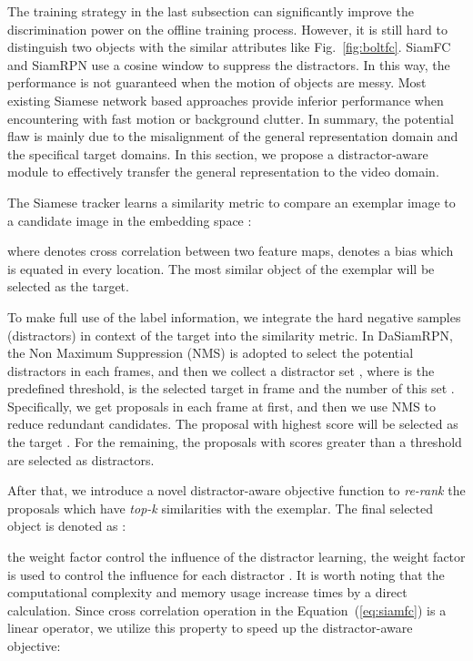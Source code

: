 \documentclass[runningheads]{llncs}
\begin{document}
The training strategy in the last subsection can significantly improve the discrimination power on the offline training process.
However, it is still hard to distinguish two objects with the similar attributes like Fig.~\ref{fig:boltfc}. SiamFC and SiamRPN use a cosine window to suppress the distractors. In this way, the performance is not guaranteed when the motion of objects are messy. Most existing Siamese network based approaches provide inferior performance when encountering with fast motion or background clutter. In summary, the potential flaw is mainly due to the misalignment of the general representation domain and the specifical target domains. In this section, we propose a distractor-aware module to effectively transfer the general representation to the video domain.

The Siamese tracker learns a similarity metric  to compare an exemplar image  to a candidate image  in the embedding space :

where  denotes cross correlation between two feature maps,  denotes a bias which is equated in every location. The most similar object of the exemplar will be selected as the target.

To make full use of the label information, we integrate the hard negative samples (distractors) in context of the target into the similarity metric.
In DaSiamRPN, the Non Maximum Suppression (NMS) is adopted to select the potential distractors  in each frames, and then we collect a distractor set , where  is the predefined threshold,  is the selected target in frame  and the number of this set . Specifically, we get  proposals in each frame at first, and then we use NMS to reduce redundant candidates. The proposal with highest score will be selected as the target . For the remaining, the proposals with scores greater than a threshold are selected as distractors.

After that, we introduce a novel distractor-aware objective function to \emph{re-rank} the proposals  which have \emph{top-k} similarities with the exemplar. The final selected object is denoted as :

the weight factor  control the influence of the distractor learning, the weight factor  is used to control the influence for each distractor . It is worth noting that the computational complexity and memory usage increase  times by a direct calculation.
Since cross correlation operation in the Equation~(\ref{eq:siamfc}) is a linear operator, we utilize this property to speed up the distractor-aware objective:
\end{document}
